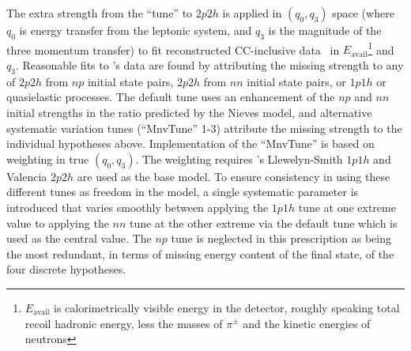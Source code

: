 The extra strength from the ``\minerva tune'' to $2p2h$ is applied in $(q_0,q_3)$ space (where $q_0$ is energy transfer from the leptonic system, and $q_3$ is the magnitude of the three momentum transfer) to fit reconstructed \minerva CC-inclusive data~\cite{Rodrigues:2015hik} in $E_\text{avail}$\footnote{$E_\text{avail}$ is calorimetrically visible energy in the detector, roughly speaking total recoil hadronic energy, less the masses of $\pi^\pm$ and the kinetic energies of neutrons} and $q_3$.  Reasonable fits to \minerva's data are found by attributing the missing strength to any of $2p2h$ from $np$ initial state pairs, $2p2h$ from $nn$ initial state pairs, or $1p1h$ or quasielastic processes.  The default tune uses an enhancement of the $np$ and $nn$ initial strengths in the ratio predicted by the Nieves model, and alternative systematic variation tunes (``MnvTune'' 1-3) attribute the missing strength to the individual hypotheses above. Implementation of the ``MnvTune'' is based on weighting in true $(q_0,q_3)$. The weighting requires 's Llewelyn-Smith $1p1h$ and Valencia $2p2h$ are used as the base model. To ensure consistency in using these different tunes as freedom in the model, a single systematic parameter is introduced that varies smoothly between applying the $1p1h$ tune at one extreme value to applying the $nn$ tune at the other extreme via the default tune which is used as the central value. The $np$ tune is neglected in this prescription as being the most redundant, in terms of missing energy content of the final state, of the four discrete hypotheses.

